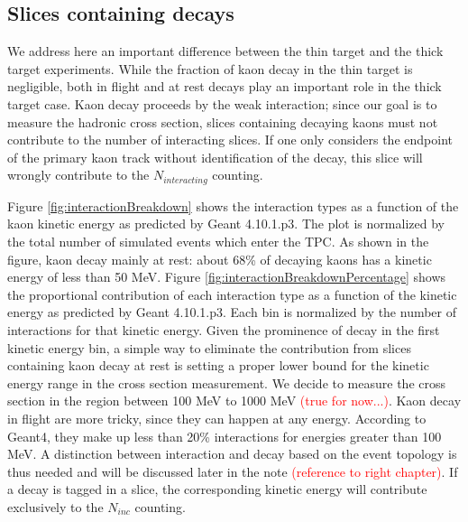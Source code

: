 \subsection{Slices containing decays}
We address here an important difference between the thin target and the thick target experiments. While the fraction of kaon decay in the thin target is negligible, both in flight and at rest decays play an important role in the thick target case. 
Kaon decay proceeds by the weak interaction; since our goal is to measure the hadronic cross section, slices containing decaying kaons must not contribute to the number of interacting slices. If one only considers the endpoint of the primary kaon track without identification of the decay, this slice will  wrongly contribute to the $N_{interacting}$ counting. 

Figure \ref{fig:interactionBreakdown} shows the interaction types as a function of the kaon kinetic energy as predicted by  Geant 4.10.1.p3. The plot is normalized by the total number of simulated events which enter the TPC.
As shown in the figure, kaon decay mainly at rest: about 68\% of decaying kaons has a kinetic energy of less than 50 MeV. 
Figure \ref{fig:interactionBreakdownPercentage} shows the proportional contribution of each interaction type as a function of the kinetic energy as predicted by  Geant 4.10.1.p3. Each bin is normalized by the number of interactions for that kinetic energy.
Given the prominence of decay in the first kinetic energy bin, a simple way to eliminate the contribution from slices containing kaon decay at rest is setting a proper lower bound for the kinetic energy range in the cross section measurement. We decide to measure the cross section in the region between 100 MeV to 1000 MeV \textcolor{red}{(true for now...)}.
Kaon decay in flight are more tricky, since they can happen at any energy. According to Geant4, they make up less than 20\% interactions for energies greater than 100 MeV. A distinction between interaction and decay based on the event topology is thus needed and will be discussed later in the note  \textcolor{red}{(reference to right chapter)}. If a decay is tagged in a slice, the corresponding kinetic energy will contribute exclusively to the $N_{inc}$ counting.\\


     
